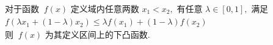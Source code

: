 \documentclass[preview]{standalone}
\begin{document}
\begin{align*}
& \text{对于函数 }\ f(x) \text{ 定义域内任意两数 } x_1 < x_2, \text{ 有任意 } \lambda \in [0, 1], \text{ 满足} \\ & f(\lambda x_1 + (1 - \lambda) x_2) \leq \lambda f(x_1) + (1 - \lambda) f(x_2) \\ & \text{则 }\ f(x) \text{ 为其定义区间上的下凸函数.}
\end{align*}
\end{document}
